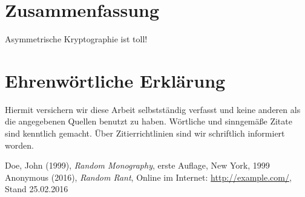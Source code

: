 \documentclass[a4paper, fontsize=12pt, toc=bibliographynumbered]{scrreprt}
\begin{document}
\author{}
\chapter{Zusammenfassung}

Asymmetrische Kryptographie ist toll!

\author{}
\chapter{Ehrenwörtliche Erklärung}

Hiermit versichern wir diese Arbeit selbstständig verfasst und keine
anderen als die angegebenen Quellen benutzt zu haben.  Wörtliche und
sinngemäße Zitate sind kenntlich gemacht.  Über Zitierrichtlinien
sind wir schriftlich informiert worden.

\renewcommand{\bibname}{Quellenverzeichnis}
\begin{thebibliography}{9}
 Doe, John (1999), \emph{Random Monography}, erste
  Auflage, New York, 1999
 Anonymous (2016), \emph{Random Rant}, Online im
  Internet: \url{http://example.com/}, Stand 25.02.2016
\end{thebibliography}
\end{document}
